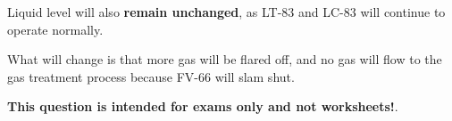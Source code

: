 \vskip 10pt

Liquid level will also {\bf remain unchanged}, as LT-83 and LC-83 will continue to operate normally.  

\vskip 10pt

What will change is that more gas will be flared off, and no gas will flow to the gas treatment process because FV-66 will slam shut.








{\bf This question is intended for exams only and not worksheets!}.



